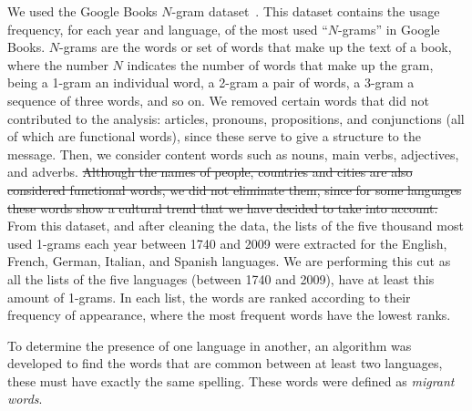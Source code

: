 \documentclass[10pt,letterpaper]{article} %
\begin{document}
We used the Google Books $N$-gram dataset~\cite{ngramv}.
This dataset contains the usage frequency, for each year and language, of
the most used ``$N$-grams'' in Google Books. 
$N$-grams are the words or set of words that make up the text of a
book, where the number $N$ indicates the number of words that make up the gram,
being a 1-gram an individual word, a 2-gram a pair of words,
a 3-gram a sequence of three words, and so on.
We removed certain words that did not contributed to the analysis: articles,
pronouns, propositions, and conjunctions (all  of which are functional words),
since these serve to give a structure to the message. Then, we consider content
words such as nouns, main verbs, adjectives, and adverbs. 
\st{Although the names of people, countries and
cities are also considered functional words, we did not eliminate them, since
for some languages these words show a cultural trend that we have decided to
take into account. } 
From this dataset, and after cleaning the data, the lists of the five thousand
most used 1-grams each year
between 1740 and 2009 were extracted for the English, French, German, Italian,
and Spanish languages.
We are performing this cut as all the lists of the five languages (between 1740
and 2009), have at least this amount of 1-grams.
In each list, the words are ranked according to their
frequency of appearance, where the most frequent words have the lowest ranks.

% 

To determine the presence of one language in another, an algorithm was
developed to find the words that are common between at least two languages,
these must have exactly the same spelling. These words were defined
as \textit{migrant words}. 
\end{document}
